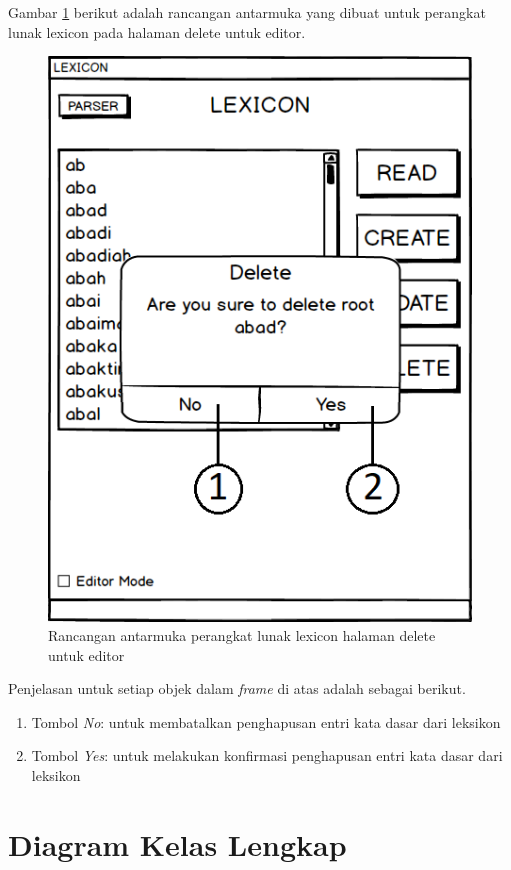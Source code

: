 Gambar \ref{mockup-lexicon-delete-editor} berikut adalah rancangan antarmuka yang dibuat untuk perangkat lunak lexicon pada halaman delete untuk editor.

\begin{figure}[H]
\centering
\includegraphics[scale=0.8]{Gambar/mockup-lexicon-delete-editor}
\caption{Rancangan antarmuka perangkat lunak lexicon halaman delete untuk editor} 
\label{mockup-lexicon-delete-editor}
\end{figure}

Penjelasan untuk setiap objek dalam \textit{frame} di atas adalah sebagai berikut.

\begin{enumerate}
	\item Tombol \textit{No}: untuk membatalkan penghapusan entri kata dasar dari leksikon
	\item Tombol \textit{Yes}: untuk melakukan konfirmasi penghapusan entri kata dasar dari leksikon
\end{enumerate}


\section{Diagram Kelas Lengkap}
\label{sec:DiagramKelasLengkap}

